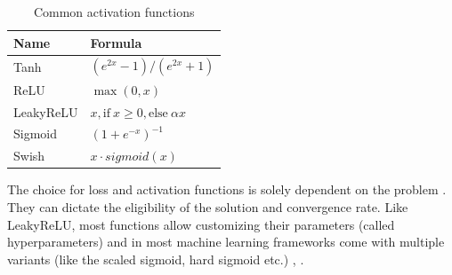 \begin{table}[htbp]
\begin{center}
\begin{tabular}
{|p{120pt}|p{120pt}|}
\hline
 Name  &  Formula\\
\hline Tanh & $(e^{2x}-1)/(e^{2x}+1)$ \\ 
\hline ReLU & $\max(0, x)$ \\ 
\hline LeakyReLU & $ x, \text{if} \ x \geq 0, \text{else} \ \alpha x $ \\ 
\hline Sigmoid & $(1+e^{-x})^{-1}$ \\ 
\hline Swish & $x \cdot \textit{sigmoid}(x)$ \\ 
\hline
\end{tabular}
\end{center}
\caption{Common activation functions \cite{activsurvey}}
\label{Activations}
\end{table}

The choice for loss and activation functions is solely dependent on the problem \cite{losssurvey}. They can dictate the eligibility of the solution and convergence rate. Like LeakyReLU, most functions allow customizing their parameters (called hyperparameters) and in most machine learning frameworks come with multiple variants (like the scaled sigmoid, hard sigmoid etc.) \cite{activsurvey}, \cite{actfcomp}.